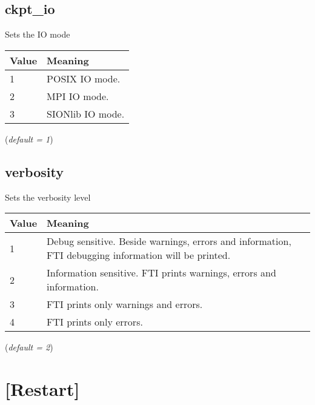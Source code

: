 \documentclass{refrep}
\begin{document}
\subsection{ckpt\_io}\label{subsec:ckptio}
Sets the IO mode
\begin{center}
\begin{tabular}[h!]{|p{}|p{}|}
\hline
\textbf{Value} & \textbf{Meaning} \\ \hline
1 & POSIX IO mode.  \\ \hline
2 & MPI IO mode. \\ \hline
3 & SIONlib IO mode.  \\ \hline
\end{tabular}
\end{center}
(\textit{default = 1})
\subsection{verbosity}\label{subsec:verbosity}
Sets the verbosity level
\begin{center}
\begin{tabular}[h!]{|p{}|p{}|}
\hline
\textbf{Value} & \textbf{Meaning} \\ \hline
1 & Debug sensitive. Beside warnings, errors and information, FTI debugging information will be printed.  \\ \hline
2 & Information sensitive. FTI prints warnings, errors and information. \\ \hline
3 & FTI prints only warnings and errors.  \\ \hline
4 & FTI prints only errors.  \\ \hline
\end{tabular}
\end{center}
(\textit{default = 2})
\section{[Restart]}\label{sec:restart}
\end{document}
